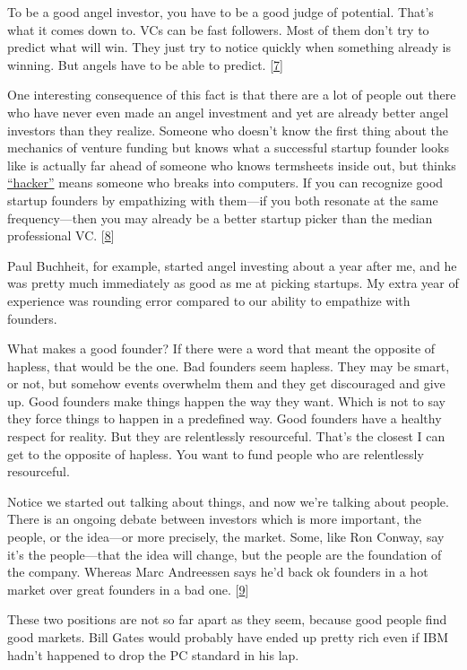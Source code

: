 To be a good angel investor, you have to be a good judge of potential.
That's what it comes down to. VCs can be fast followers. Most of them
don't try to predict what will win. They just try to notice quickly when
something already is winning. But angels have to be able to predict.
{[}\hyperref[f7n]{7}{]}

One interesting consequence of this fact is that there are a lot of
people out there who have never even made an angel investment and yet
are already better angel investors than they realize. Someone who
doesn't know the first thing about the mechanics of venture funding but
knows what a successful startup founder looks like is actually far ahead
of someone who knows termsheets inside out, but thinks
\href{gba.html}{``hacker''} means someone who breaks into computers. If
you can recognize good startup founders by empathizing with them---if
you both resonate at the same frequency---then you may already be a
better startup picker than the median professional VC.
{[}\hyperref[f8n]{8}{]}

Paul Buchheit, for example, started angel investing about a year after
me, and he was pretty much immediately as good as me at picking
startups. My extra year of experience was rounding error compared to our
ability to empathize with founders.

What makes a good founder? If there were a word that meant the opposite
of hapless, that would be the one. Bad founders seem hapless. They may
be smart, or not, but somehow events overwhelm them and they get
discouraged and give up. Good founders make things happen the way they
want. Which is not to say they force things to happen in a predefined
way. Good founders have a healthy respect for reality. But they are
relentlessly resourceful. That's the closest I can get to the opposite
of hapless. You want to fund people who are relentlessly resourceful.

Notice we started out talking about things, and now we're talking about
people. There is an ongoing debate between investors which is more
important, the people, or the idea---or more precisely, the market.
Some, like Ron Conway, say it's the people---that the idea will change,
but the people are the foundation of the company. Whereas Marc
Andreessen says he'd back ok founders in a hot market over great
founders in a bad one. {[}\hyperref[f9n]{9}{]}

These two positions are not so far apart as they seem, because good
people find good markets. Bill Gates would probably have ended up pretty
rich even if IBM hadn't happened to drop the PC standard in his lap.

